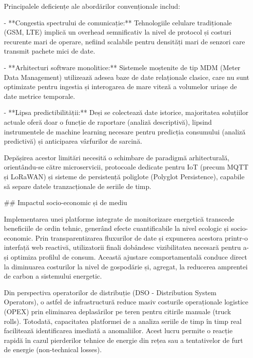 Principalele deficiențe ale abordărilor convenționale includ:

- **Congestia spectrului de comunicație:** Tehnologiile celulare
  tradiționale (GSM, LTE) implică un overhead semnificativ la nivel de
  protocol și costuri recurente mari de operare, nefiind scalabile
  pentru densități mari de senzori care transmit pachete mici de date.

- **Arhitecturi software monolitice:** Sistemele moștenite de tip MDM
  (Meter Data Management) utilizează adesea baze de date relaționale
  clasice, care nu sunt optimizate pentru ingestia și interogarea de
  mare viteză a volumelor uriașe de date metrice temporale.

- **Lipsa predictibilității:** Deși se colectează date istorice,
  majoritatea soluțiilor actuale oferă doar o funcție de raportare
  (analiză descriptivă), lipsind instrumentele de machine learning
  necesare pentru predicția consumului (analiză predictivă) și
  anticiparea vârfurilor de sarcină.

Depășirea acestor limitări necesită o schimbare de paradigmă
arhitecturală, orientându-se către microservicii, protocoale dedicate
pentru IoT (precum MQTT și LoRaWAN) și sisteme de persistență poliglote
(Polyglot Persistence), capabile să separe datele tranzacționale de
seriile de timp.

## Impactul socio-economic și de mediu

Implementarea unei platforme integrate de monitorizare energetică
transcede beneficiile de ordin tehnic, generând efecte cuantificabile la
nivel ecologic și socio-economic. Prin transparentizarea fluxurilor de
date și expunerea acestora printr-o interfață web reactivă, utilizatorii
finali dobândesc vizibilitatea necesară pentru a-și optimiza profilul de
consum. Această ajustare comportamentală conduce direct la diminuarea
costurilor la nivel de gospodărie și, agregat, la reducerea amprentei de
carbon a sistemului energetic.

Din perspectiva operatorilor de distribuție (DSO - Distribution System
Operators), o astfel de infrastructură reduce masiv costurile
operaționale logistice (OPEX) prin eliminarea deplasărilor pe teren
pentru citirile manuale (truck rolls). Totodată, capacitatea platformei
de a analiza seriile de timp în timp real facilitează identificarea
imediată a anomaliilor. Acest lucru permite o reacție rapidă în cazul
pierderilor tehnice de energie din rețea sau a tentativelor de furt de
energie (non-technical losses).

